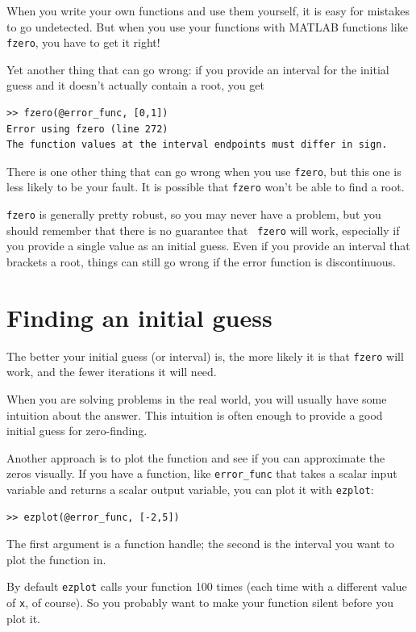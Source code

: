 \documentclass[
]{book}
\begin{document}
When you write your own functions and use them yourself, it is easy
for mistakes to go undetected.  But when you use your functions with
MATLAB functions like {\tt fzero}, you have to get it right!

Yet another thing that can go wrong: if you provide an interval for the
initial guess and it doesn't actually contain a root, you get

\begin{verbatim}
>> fzero(@error_func, [0,1])
Error using fzero (line 272)
The function values at the interval endpoints must differ in sign.
\end{verbatim}

There is one other thing that can go wrong when you use {\tt fzero}, but
this one is less likely to be your fault.  It is possible that {\tt fzero}
won't be able to find a root.

{\tt fzero} is generally pretty robust, so you may never have a
problem, but you should remember that there is no guarantee that {\tt
fzero} will work, especially if you provide a single value as an
initial guess.  Even if you provide an interval that brackets a root,
things can still go wrong if the error function is discontinuous.


\section{Finding an initial guess}

The better your initial guess (or interval) is, the more likely
it is that {\tt fzero} will work, and the fewer iterations it will
need.

When you are solving problems in the real world, you will usually
have some intuition about the answer.  This intuition is often enough
to provide a good initial guess for zero-finding.

Another approach is to plot the function and see if you can
approximate the zeros visually.  If you have a function, like
{\tt error\_func} that takes a scalar input variable and returns
a scalar output variable, you can plot it with {\tt ezplot}:

\begin{verbatim}
>> ezplot(@error_func, [-2,5])
\end{verbatim}

The first argument is a function handle; the second is the
interval you want to plot the function in.

By default {\tt ezplot} calls your function 100 times (each time
with a different value of {\tt x}, of course).  So you probably want
to make your function silent before you plot it.
\end{document}
